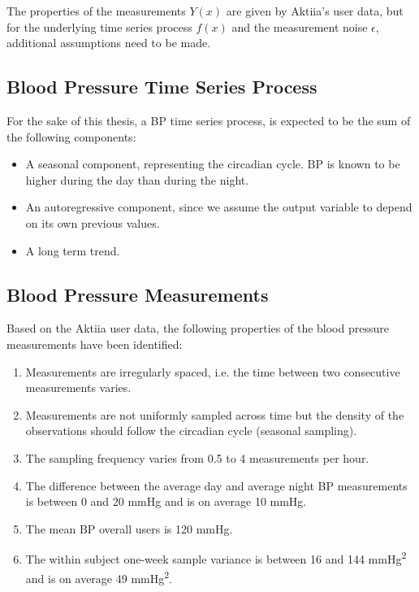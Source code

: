 The properties of the measurements $Y(x)$ are given by Aktiia's
user data, but for the underlying time series process $f(x)$ and the measurement noise
$\epsilon$, additional assumptions need to be made.

\subsection{Blood Pressure Time Series Process}\label{subsec:blood-pressure-time-series-process}
For the sake of this thesis, a BP time series process,
is expected to be the sum of the following components:
\begin{itemize}
    \item A seasonal component, representing the circadian cycle.
    BP is known to be higher during the day than during the night.
    \item An autoregressive component, since we assume the output variable to depend on its own previous values.
    \item A long term trend.
\end{itemize}


\subsection{Blood Pressure Measurements}\label{subsec:blood-pressure-measurements}
Based on the Aktiia user data, the following properties of
the blood pressure measurements have been identified:
\begin{enumerate}
    \item Measurements are irregularly spaced, i.e. the time between two consecutive measurements varies.
    \item Measurements are not uniformly sampled across time but the density of the observations should
    follow the circadian cycle (seasonal sampling).
    \item The sampling frequency varies from 0.5 to 4 measurements per hour.
    \item The difference between the average day and average night BP measurements is between
    0 and 20 mmHg and is on average 10 mmHg.
    \item The mean BP overall users is 120 mmHg.
    \item The within subject one-week sample variance is between 16 and
    144 mmHg\textsuperscript{2} and is on average 49 mmHg\textsuperscript{2}.
\end{enumerate}


